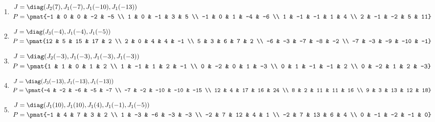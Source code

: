 \begin{enumerate}
\item

\begin{align*}
J &= \diag(J_{2}(7), J_{1}(-7), J_{1}(-10), J_{1}(-13))\\
P &= \pmat{-1 & 0 & 0 & -2 & -5 \\ 1 & 0 & -1 & 3 & 5 \\ -1 & 0 & 1 & -4 & -6 \\ 1 & -1 & -1 & 1 & 4 \\ 2 & -1 & -2 & 5 & 11}
\end{align*}

\item

\begin{align*}
J &= \diag(J_{3}(-4), J_{1}(-4), J_{1}(-5))\\
P &= \pmat{12 & 5 & 15 & 17 & 2 \\ 2 & 0 & 4 & 4 & -1 \\ 5 & 3 & 6 & 7 & 2 \\ -6 & -3 & -7 & -8 & -2 \\ -7 & -3 & -9 & -10 & -1}
\end{align*}

\item

\begin{align*}
J &= \diag(J_{2}(-3), J_{1}(-3), J_{1}(-3), J_{1}(-3))\\
P &= \pmat{1 & 1 & 0 & 1 & 2 \\ 1 & -1 & 1 & 2 & -1 \\ 0 & -2 & 0 & 1 & -3 \\ 0 & 1 & -1 & -1 & 2 \\ 0 & -2 & 1 & 2 & -3}
\end{align*}

\item

\begin{align*}
J &= \diag(J_{3}(-13), J_{1}(-13), J_{1}(-13))\\
P &= \pmat{-4 & -2 & -6 & -5 & -7 \\ -7 & -2 & -10 & -10 & -15 \\ 12 & 4 & 17 & 16 & 24 \\ 8 & 2 & 11 & 11 & 16 \\ 9 & 3 & 13 & 12 & 18}
\end{align*}

\item

\begin{align*}
J &= \diag(J_{1}(10), J_{1}(10), J_{1}(4), J_{1}(-1), J_{1}(-5))\\
P &= \pmat{-1 & 4 & 7 & 3 & 2 \\ 1 & -3 & -6 & -3 & -3 \\ -2 & 7 & 12 & 4 & 1 \\ -2 & 7 & 13 & 6 & 4 \\ 0 & -1 & -2 & -1 & 0}
\end{align*}


\end{enumerate}
